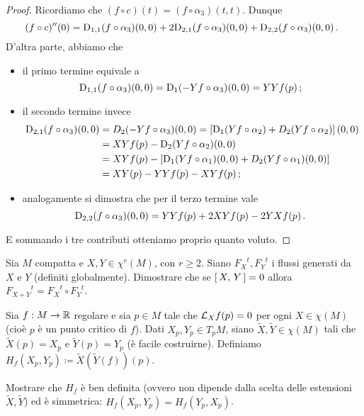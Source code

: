\begin{proof}
	Ricordiamo che $(f\circ c)(t)=(f\circ\alpha_3)(t,t)$. Dunque 
	\begin{equation*}
		(f\circ c)''(0)=\mathrm D_{1,1}(f\circ\alpha_3)(0,0)+2\mathrm D_{2,1}(f\circ\alpha_3)(0,0)+\mathrm D_{2,2}(f\circ\alpha_3)(0,0)\, \text{. }
	\end{equation*}
	D'altra parte, abbiamo che
	\begin{itemize}
	 \item il primo termine equivale a
	\begin{equation*}
		\mathrm D_{1,1}(f\circ\alpha_3)(0,0)=\mathrm D_1(-Yf\circ\alpha_3)(0,0)=YYf(p)\, \text{; }
	\end{equation*}
	\item il secondo termine invece
	\begin{align*}
		\mathrm D_{2,1}(f\circ\alpha_3)(0,0) &= D_2(-Yf\circ\alpha_3)(0,0) = \left[\mathrm D_1(Yf\circ\alpha_2)+D_2(Yf\circ\alpha_2)\right](0,0)
		\\ &= XYf(p)-\mathrm D_2(Yf\circ\alpha_2)(0,0)
		\\ &= XYf(p)-[\mathrm D_1(Yf\circ\alpha_1)(0,0)+D_2(Yf\circ\alpha_1)(0,0)]
		\\ &= XY(p)-YYf(p)-XYf(p) \, \text{; }
	\end{align*}
	\item analogamente si dimostra che per il terzo termine vale
	\begin{equation*}
		\mathrm D_{2,2}(f\circ\alpha_3)(0,0)=YYf(p)+2XYf(p)-2YXf(p) \, \text{. }
	\end{equation*}
	\end{itemize}
	E sommando i tre contributi otteniamo proprio quanto voluto.
\end{proof}

\begin{exercise}
	Sia $M$ compatta e $X,Y\in\chi^r(M)$, con $r\ge 2$. Siano ${F_X}^t,{F_Y}^t$ i flussi generati da $X$ e $Y$ (definiti globalmente). Dimostrare che se $\left[\,X,\,Y\,\right]=0$ allora ${F_{X+Y}}^t={F_X}^t\circ {F_Y}^t$.
\end{exercise}

\begin{exercise}
	Sia $f:M\to \mathbb R$ regolare e sia $p\in M$ tale che $\mathcal L_Xf(p)=0$ per ogni $X\in\chi(M)$ (cioè $p$ è un punto critico di $f$). Dati $X_p,Y_p\in T_pM$, siano $\tilde{X},\tilde{Y}\in\chi(M)$ tali che $\tilde{X}(p)=X_p$ e $\tilde{Y}(p)=Y_p$ (è facile costruirne). Definiamo $H_f(X_p,Y_p)\coloneqq\tilde{X}(\tilde{Y}(f))(p)$.
	
	Mostrare che $H_f$ è ben definita (ovvero non dipende dalla scelta delle estensioni $\tilde{X},\tilde{Y}$) ed è simmetrica: $H_f(X_p,Y_p)=H_f(Y_p,X_p)$.
\end{exercise}



